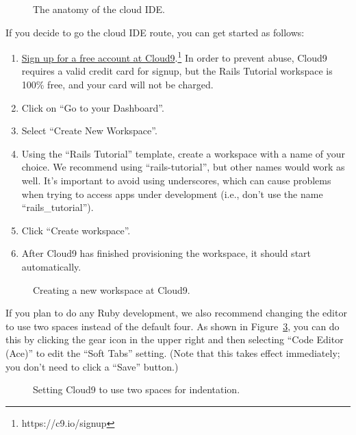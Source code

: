 \begin{figure}
\begin{center}
\end{center}
\caption{The anatomy of the cloud IDE.\label{fig:ide_anatomy}}
\end{figure}

If you decide to go the cloud IDE route, you can get started as follows:
\begin{enumerate}
\item \href{https://c9.io/web/sign-up/free}{Sign up for a free account at Cloud9}.\footnote{https://c9.io/signup} In order to prevent abuse, Cloud9 requires a valid credit card for signup, but the Rails Tutorial workspace is 100\% free, and your card will not be charged.
\item Click on ``Go to your Dashboard''.
\item Select ``Create New Workspace''.
\item Using the ``Rails Tutorial'' template, create a workspace with a name of your choice. We recommend using ``rails-tutorial'', but other names would work as well. It's important to avoid using underscores, which can cause problems when trying to access apps under development (i.e., don't use the name ``rails\_tutorial'').
\item Click ``Create workspace''.
\item After Cloud9 has finished provisioning the workspace, it should start automatically.
\end{enumerate}

\begin{figure}
\begin{center}
\end{center}
\caption{Creating a new workspace at Cloud9.\label{fig:cloud9_new_workspace}}
\end{figure}

If you plan to do any Ruby development, we also recommend changing the editor to use two spaces instead of the default four. As shown in Figure~\ref{fig:cloud9_two_spaces}, you can do this by clicking the gear icon in the upper right and then selecting ``Code Editor (Ace)'' to edit the ``Soft Tabs'' setting. (Note that this takes effect immediately; you don't need to click a ``Save'' button.)

\begin{figure}
\begin{center}
\end{center}
\caption{Setting Cloud9 to use two spaces for indentation.\label{fig:cloud9_two_spaces}}
\end{figure}

